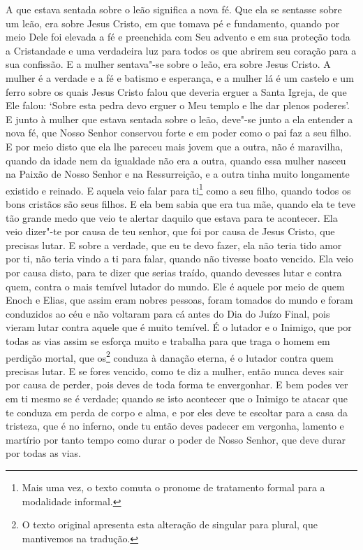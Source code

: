 A que estava sentada sobre o leão significa a nova fé. Que ela se sentasse
sobre um leão, era sobre Jesus Cristo, em que tomava pé e fundamento, quando
por meio Dele foi elevada a fé e preenchida com Seu advento e em sua proteção
toda a Cristandade e uma verdadeira luz para todos os que abrirem seu coração
para a sua confissão. E a mulher sentava"-se sobre o leão,  era sobre Jesus
Cristo. A mulher é a verdade e a fé e batismo e esperança, e a mulher lá é um
castelo e um ferro sobre os quais Jesus Cristo falou que deveria erguer a Santa
Igreja, de que Ele falou: ‘Sobre esta pedra devo erguer o Meu templo e lhe dar
plenos poderes’. E junto à mulher que estava sentada sobre o leão, deve"-se
junto a ela entender a nova fé, que Nosso Senhor conservou forte e em poder
como o pai faz a seu filho. E por meio disto que ela lhe pareceu mais jovem que
a outra, não é maravilha, quando da idade nem da igualdade não era a outra,
quando essa mulher nasceu na Paixão de Nosso Senhor e na Ressurreição, e a
outra tinha muito longamente existido e reinado. E aquela veio falar para
ti\footnote{ Mais uma vez, o texto comuta o pronome de tratamento formal para a
modalidade informal.}  como a seu filho, quando todos os bons
cristãos são seus filhos. E ela bem sabia que era tua mãe, quando ela te teve
tão grande medo que veio te alertar daquilo que estava para te acontecer. Ela
veio dizer"-te por causa de teu senhor, que foi por causa de Jesus Cristo, que
precisas lutar. E sobre a verdade, que eu te devo fazer, ela não teria tido
amor por ti, não teria vindo a ti para falar, quando não tivesse boato vencido.
Ela veio por causa disto, para te dizer que serias traído, quando devesses
lutar e contra quem, contra o mais temível lutador do mundo. Ele é aquele por
meio de quem Enoch e Elias, que assim eram nobres pessoas, foram tomados do
mundo e foram conduzidos ao céu e não voltaram para cá antes do Dia do Juízo
Final, pois vieram lutar contra aquele que é muito temível. É o lutador e o
Inimigo, que por todas as vias assim se esforça muito e trabalha para que traga
o homem em perdição mortal, que os\footnote{ O texto original apresenta esta
alteração de singular para plural, que mantivemos na tradução.} 
conduza à danação eterna, é o lutador contra quem precisas lutar. E se fores
vencido, como te diz a mulher, então nunca deves sair por causa de perder, pois
deves de toda forma te envergonhar. E bem podes ver em ti mesmo se é verdade;
quando se isto acontecer que o Inimigo te atacar que te conduza em perda de
corpo e alma, e por eles deve te escoltar para a casa da tristeza, que é no
inferno, onde tu então deves padecer em vergonha, lamento e martírio por tanto
tempo como durar o poder de Nosso Senhor, que deve durar por todas as vias.


